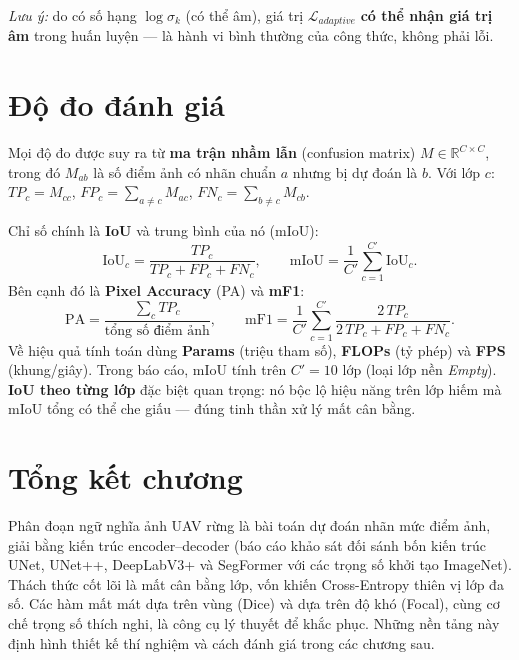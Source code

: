 \noindent\textit{Lưu ý:} do có số hạng $\log\sigma_k$ (có thể âm), giá trị
$\mathcal{L}_{adaptive}$ \textbf{có thể nhận giá trị âm} trong huấn luyện --- là hành vi
bình thường của công thức, không phải lỗi.

\section{Độ đo đánh giá}
\label{sec:metrics}

Mọi độ đo được suy ra từ \textbf{ma trận nhầm lẫn} (confusion matrix) $M\in\mathbb{R}^{C\times C}$,
trong đó $M_{ab}$ là số điểm ảnh có nhãn chuẩn $a$ nhưng bị dự đoán là $b$. Với lớp
$c$: $TP_c=M_{cc}$, $FP_c=\sum_{a\neq c}M_{ac}$, $FN_c=\sum_{b\neq c}M_{cb}$.

Chỉ số chính là \textbf{IoU} và trung bình của nó (mIoU):
\begin{equation}
\mathrm{IoU}_c = \frac{TP_c}{TP_c + FP_c + FN_c}, \qquad
\mathrm{mIoU} = \frac{1}{C'}\sum_{c=1}^{C'}\mathrm{IoU}_c.
\label{eq:miou}
\end{equation}
Bên cạnh đó là \textbf{Pixel Accuracy} (PA) và \textbf{mF1}:
\begin{equation}
\mathrm{PA} = \frac{\sum_c TP_c}{\text{tổng số điểm ảnh}}, \qquad
\mathrm{mF1} = \frac{1}{C'}\sum_{c=1}^{C'}\frac{2\,TP_c}{2\,TP_c + FP_c + FN_c}.
\end{equation}
Về hiệu quả tính toán dùng \textbf{Params} (triệu tham số), \textbf{FLOPs} (tỷ phép) và
\textbf{FPS} (khung/giây). Trong báo cáo, mIoU tính trên $C' = 10$ lớp (loại lớp nền
\textit{Empty}). \textbf{IoU theo từng lớp} đặc biệt quan trọng: nó bộc lộ hiệu năng
trên lớp hiếm mà mIoU tổng có thể che giấu --- đúng tinh thần xử lý mất cân bằng.

\section{Tổng kết chương}
Phân đoạn ngữ nghĩa ảnh UAV rừng là bài toán dự đoán nhãn mức điểm ảnh, giải bằng kiến trúc encoder--decoder (báo cáo khảo sát đối sánh bốn kiến trúc UNet, UNet++, DeepLabV3+ và SegFormer với các trọng số khởi tạo ImageNet). Thách thức cốt lõi là mất cân bằng lớp, vốn khiến Cross-Entropy thiên vị lớp đa số. Các hàm mất mát dựa trên vùng (Dice) và dựa trên độ khó (Focal), cùng cơ chế trọng số thích nghi, là công cụ lý thuyết để khắc phục. Những nền tảng này định hình thiết kế thí nghiệm và cách đánh giá trong các chương sau.
